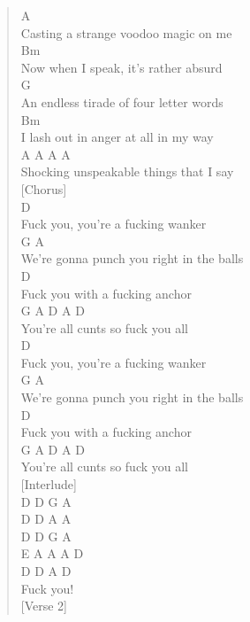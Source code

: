 \documentclass[11pt]{article}
\begin{document}
\begin{verse}
\hspace*{5em}A\\
Casting a strange voodoo magic on me\\
\hspace*{3em}Bm\\
Now when I speak, it's rather absurd\\
\hspace*{2em}G\\
An endless tirade of four letter words\\
\hspace*{3em}Bm\\
I lash out in anger at all in my way\\
\hspace*{3em}A                                 A A A\\
Shocking unspeakable things that I say\\
\vspace*{1em}
[Chorus]\\
D\\
Fuck you, you're a fucking wanker\\
G                      A\\
We're gonna punch you right in the balls\\
D\\
Fuck you with a fucking anchor\\
G           A        D    A   D\\
You're all cunts so fuck you all\\
D\\
Fuck you, you're a fucking wanker\\
G                      A\\
We're gonna punch you right in the balls\\
D\\
Fuck you with a fucking anchor\\
G           A        D    A   D\\
You're all cunts so fuck you all\\
\vspace*{1em}
[Interlude]\\
D D G A\\
D D A A\\
D D G A\\
E A  A A D\\
D D A D\\
Fuck you!\\
\vspace*{1em}
[Verse 2]\\

\end{verse}
\end{document}
